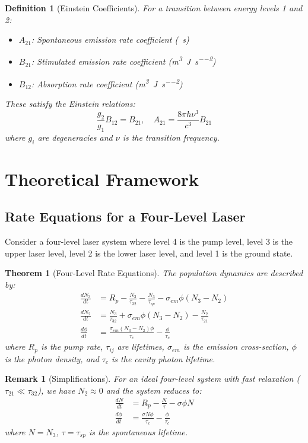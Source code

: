 \documentclass[a4paper, 11pt]{article}
\newtheorem{definition}{Definition}[section]
\newtheorem{theorem}{Theorem}[section]
\newtheorem{remark}{Remark}[section]
\begin{document}
\begin{definition}[Einstein Coefficients]
For a transition between energy levels 1 and 2:
\begin{itemize}
\item $A_{21}$: Spontaneous emission rate coefficient (\si{\per\second})
\item $B_{21}$: Stimulated emission rate coefficient (\si{\meter\cubed\per\joule\per\second\squared})
\item $B_{12}$: Absorption rate coefficient (\si{\meter\cubed\per\joule\per\second\squared})
\end{itemize}
These satisfy the Einstein relations:
\begin{equation}
\frac{g_2}{g_1} B_{12} = B_{21}, \quad A_{21} = \frac{8\pi h\nu^3}{c^3} B_{21}
\end{equation}
where $g_i$ are degeneracies and $\nu$ is the transition frequency.
\end{definition}

\section{Theoretical Framework}

\subsection{Rate Equations for a Four-Level Laser}

Consider a four-level laser system where level 4 is the pump level, level 3 is the upper
laser level, level 2 is the lower laser level, and level 1 is the ground state.

\begin{theorem}[Four-Level Rate Equations]
The population dynamics are described by:
\begin{align}
\frac{dN_3}{dt} &= R_p - \frac{N_3}{\tau_{32}} - \frac{N_3}{\tau_{sp}} - \sigma_{em} \phi (N_3 - N_2) \\
\frac{dN_2}{dt} &= \frac{N_3}{\tau_{32}} + \sigma_{em} \phi (N_3 - N_2) - \frac{N_2}{\tau_{21}} \\
\frac{d\phi}{dt} &= \frac{\sigma_{em} (N_3 - N_2) \phi}{\tau_c} - \frac{\phi}{\tau_c}
\end{align}
where $R_p$ is the pump rate, $\tau_{ij}$ are lifetimes, $\sigma_{em}$ is the emission
cross-section, $\phi$ is the photon density, and $\tau_c$ is the cavity photon lifetime.
\end{theorem}

\begin{remark}[Simplifications]
For an ideal four-level system with fast relaxation ($\tau_{21} \ll \tau_{32}$), we have
$N_2 \approx 0$ and the system reduces to:
\begin{align}
\frac{dN}{dt} &= R_p - \frac{N}{\tau} - \sigma \phi N \\
\frac{d\phi}{dt} &= \frac{\sigma N \phi}{\tau_c} - \frac{\phi}{\tau_c}
\end{align}
where $N = N_3$, $\tau = \tau_{sp}$ is the spontaneous lifetime.
\end{remark}
\end{document}
